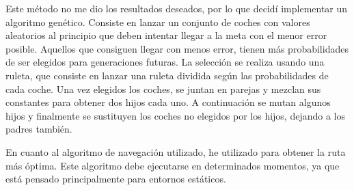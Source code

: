 \bigskip

Este método no me dio los resultados deseados, por lo que decidí implementar un algoritmo genético. Consiste en lanzar un conjunto de coches con valores aleatorios al principio que deben intentar llegar a la meta con el menor error posible. Aquellos que consiguen llegar con menos error, tienen más probabilidades de ser elegidos para generaciones futuras. La selección se realiza usando una ruleta\cite{enwiki:1141636554}, que consiste en lanzar una ruleta dividida según las probabilidades de cada coche. Una vez elegidos los coches, se juntan en parejas y mezclan sus constantes para obtener dos hijos cada uno. A continuación se mutan algunos hijos y finalmente se sustituyen los coches no elegidos por los hijos, dejando a los padres también. 

\bigskip

En cuanto al algoritmo de navegación utilizado, he utilizado \finalAlg para obtener la ruta más óptima. Este algoritmo debe ejecutarse en determinados momentos, ya que está pensado principalmente para entornos estáticos.